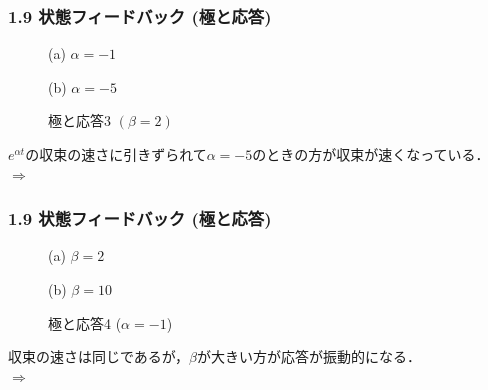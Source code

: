 \begin{frame}[t]
\frametitle{1.9 状態フィードバック (極と応答)}
\begin{figure}[t!]
 \begin{minipage}{0.5\textwidth}
  \begin{center}
   \scalebox{.8}{}
   (a) $\alpha = -1$
  \end{center}
 \end{minipage}%
 \begin{minipage}{0.5\textwidth}
  \begin{center}
   \scalebox{.8}{}
   (b) $\alpha = -5$
  \end{center}
 \end{minipage}
 \caption{極と応答3 $(\beta = 2)$}
 \label{fig_pole56}
\end{figure}
$e^{\alpha t}$の収束の速さに引きずられて$\alpha=-5$のときの方が収束が速くなっている．
$\Longrightarrow$ 

\end{frame}


\begin{frame}[t]
\frametitle{1.9 状態フィードバック (極と応答)}
\begin{figure}[t!]
 \begin{minipage}{0.5\textwidth}
  \begin{center}
   \scalebox{.8}{}
   (a) $\beta = 2$
  \end{center}
 \end{minipage}%
 \begin{minipage}{0.5\textwidth}
  \begin{center}
   \scalebox{.8}{}
   (b) $\beta = 10$
  \end{center}
 \end{minipage}
 \caption{極と応答4 ($\alpha = -1$)}
 \label{fig_pole78}
\end{figure}
収束の速さは同じであるが，$\beta$が大きい方が応答が振動的になる．\\
$\Longrightarrow$ 
\end{frame}


